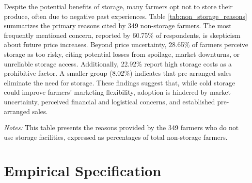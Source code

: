 Despite the potential benefits of storage, many farmers opt not to store their produce, often due to negative past experiences. Table \ref{tab:non_storage_reasons} summarizes the primary reasons cited by 349 non-storage farmers. The most frequently mentioned concern, reported by 60.75\% of respondents, is skepticism about future price increases. Beyond price uncertainty, 28.65\% of farmers perceive storage as too risky, citing potential losses from spoilage, market downturns, or unreliable storage access. Additionally, 22.92\% report high storage costs as a prohibitive factor. A smaller group (8.02\%) indicates that pre-arranged sales eliminate the need for storage. These findings suggest that, while cold storage could improve farmers’ marketing flexibility, adoption is hindered by market uncertainty, perceived financial and logistical concerns, and established pre-arranged sales.  


\begin{table}[H]
    \centering
    \footnotesize
    \caption{Reasons for Not Using Storage Facilities}
    \label{tab:non_storage_reasons}
        \begin{tablenotes}
            \item \textit{Notes:} This table presents the reasons provided by the 349 farmers who do not use storage facilities, expressed as percentages of total non-storage farmers.
        \end{tablenotes}
\end{table}


\section{Empirical Specification}
